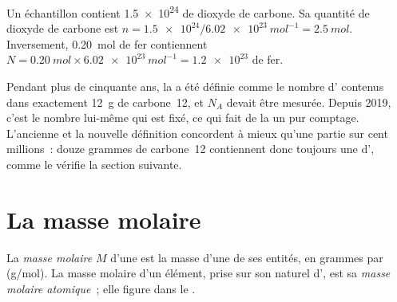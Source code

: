 \begin{example}\label{ex:g10:the-mole:convert}
Un échantillon contient \num{1.5e24}  de dioxyde de carbone. Sa
quantité de dioxyde de carbone est
$n = \num{1.5e24} / \qty{6.02e23}{mol^{-1}} = \qty{2.5}{mol}$.
Inversement, \qty{0.20}{mol} de fer contiennent
$N = \qty{0.20}{mol} \times \qty{6.02e23}{mol^{-1}} = \num{1.2e23}$
 de fer.
\end{example}

\begin{remark}\label{rem:g10:the-mole:origin}
Pendant plus de cinquante ans, la  a été définie comme le nombre
d' contenus dans exactement \qty{12}{g} de carbone~12, et $N_A$
devait être mesurée. Depuis 2019, c'est le nombre lui-même qui est fixé,
ce qui fait de la  un pur comptage. L'ancienne et la nouvelle
définition concordent à mieux qu'une partie sur cent millions~: douze
grammes de carbone~12 contiennent donc toujours une  d', comme
le vérifie la section suivante.
\end{remark}

\section{La masse molaire}

\begin{definition}\label{def:g10:the-mole:molar-mass}
La \emph{masse molaire} $M$ d'une 
est la masse d'une  de ses entités, en grammes par 
(\si{g/mol}). La masse molaire d'un élément, prise sur son 
naturel d', est sa
\emph{masse molaire atomique}~; elle figure
dans le .
\end{definition}

